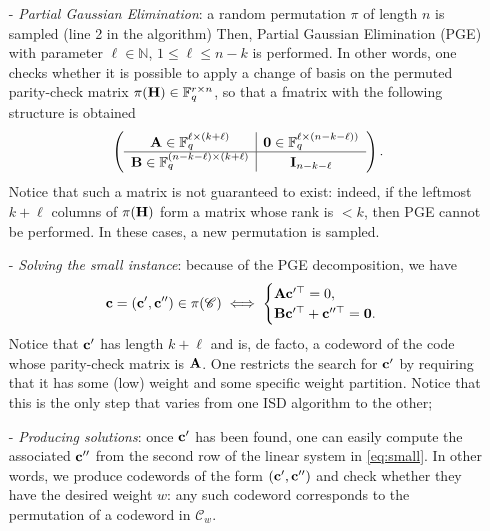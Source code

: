 \begin{itemize}
\item[-] \textit{Partial Gaussian Elimination}:
a random permutation $\pi$ of length $n$ is sampled (line 2 in the algorithm)
Then, Partial Gaussian Elimination (PGE) with parameter $\ell\in\mathbb N$, $1\leq \ell \leq n-k$ is performed.
In other words, one checks whether it is possible to apply a change of basis on the permuted parity-check matrix $\pi(\mathbf H)\in\mathbb F_q^{r\times n}$, so that a fmatrix with the following structure is obtained
$$
\left(
\begin{array}{c|c}
  \mathbf A\in\mathbb F_q^{\ell\times(k+\ell)}& \mathbf0\in\mathbb F_q^{\ell\times(n-k-\ell))}\\\hline
\mathbf B\in\mathbb F_q^{(n-k-\ell)\times(k+\ell)} & \mathbf I_{n-k-\ell}
\end{array}
\right).
$$
Notice that such a matrix is not guaranteed to exist: indeed, if the leftmost $k+\ell$ columns of $\pi(\mathbf H)$ form a matrix whose rank is $<k$, then PGE cannot be performed.
In these cases, a new permutation is sampled.
\item[-] \textit{Solving the small instance}: 
because of the PGE decomposition, we have 
\begin{equation}
\label{eq:small}
\mathbf c = (\mathbf c', \mathbf c'')\in\pi(\mathscr C)\iff\begin{cases}\mathbf A\mathbf c'^\top = 0,\\
\mathbf B\mathbf c'^\top+\mathbf c''^\top = \mathbf0.
\end{cases}
\end{equation}
Notice that $\mathbf c'$ has length $k+\ell$ and is, de facto, a codeword of the code whose parity-check matrix is $\mathbf A$.
One restricts the search for $\mathbf c'$ by requiring that it has some (low) weight and some specific weight partition.
Notice that this is the only step that varies from one ISD algorithm to the other;
\item[-] \textit{Producing solutions}: once $\mathbf c'$ has been found, one can easily compute the associated $\mathbf c''$ from the second row of the linear system in \eqref{eq:small}.
In other words, we produce codewords of the form $(\mathbf c', \mathbf c'')$ and check whether they have the desired weight $w$: any such codeword corresponds to the permutation of a codeword in $\mathscr C_w$.
\end{itemize}
